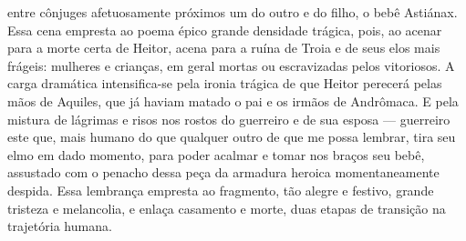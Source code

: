{entre cônjuges afetuosamente próximos um do outro e do filho, o bebê Astiánax.
Essa cena empresta ao poema épico grande densidade trágica, pois, ao acenar
para a morte certa de Heitor, acena para a ruína de Troia e de seus elos mais
frágeis: mulheres e crianças, em geral mortas ou escravizadas pelos vitoriosos.
A carga dramática intensifica-se pela ironia trágica de que Heitor perecerá
pelas mãos de Aquiles, que já haviam matado o pai e os irmãos de Andrômaca. E
pela mistura de lágrimas e risos nos rostos do guerreiro e de sua esposa ---
guerreiro este que, mais humano do que qualquer outro de que me possa lembrar,
tira seu elmo em dado momento, para poder acalmar e tomar nos braços seu bebê,
assustado com o penacho dessa peça da armadura heroica momentaneamente despida.
Essa lembrança empresta ao fragmento, tão alegre e festivo, grande tristeza e
melancolia, e enlaça casamento e morte, duas etapas de transição na trajetória
humana.}

